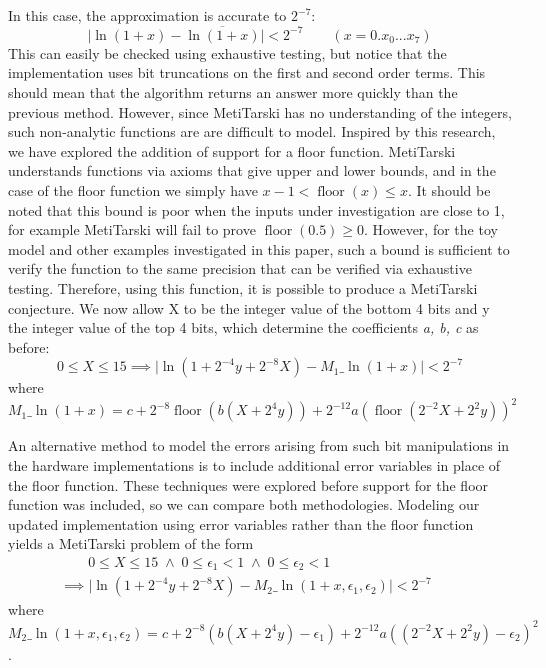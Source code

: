 \documentclass[smallcondensed]{svjour3}
\newcommand{\abs}[1]{\lvert#1\rvert}
\newcommand{\floor}{\mathop{\textrm{floor}}\nolimits}
\begin{document}
\noindent In this case, the approximation is accurate to $2^{-7}$: 
\[ 
\abs{\ln(1+x)-\overline{\ln(1+x)}} <2^{-7} \qquad (x= 0.x_0...x_7) \]
This can easily be checked using exhaustive testing, but notice that the implementation uses bit truncations on the first and second order terms. This should mean that the algorithm returns an answer more quickly than the previous method. However, since MetiTarski has no understanding of the integers, such non-analytic functions are are difficult to model. Inspired by this research, we have explored the addition of support for a floor function. MetiTarski understands functions via axioms that give upper and lower bounds, and in the case of the floor function we simply have $x-1< \floor(x)\le x$. It should be noted that this bound is poor when the inputs under investigation are close to 1, for example MetiTarski will fail to prove $\floor(0.5)\geq 0$.
However, for the toy model and other examples investigated in this paper, such a bound is sufficient to verify the function to the same precision that can be verified via exhaustive testing. Therefore, using this function, it is possible to produce a MetiTarski conjecture. We now allow X to be the integer value of the bottom 4 bits and y the integer value of the top 4 bits, which determine the coefficients \textit{a, b, c} as before:
\[
0\le X \le 15 \implies \abs{\ln(1+2^{-4}y+2^{-8}X) - M_1\_\ln(1+x)} <2^{-7}
\]
where $$M_1\_\ln(1+x)=c+2^{-8}\floor(b(X+2^{4}y))+2^{-12}a(\floor(2^{-2}X+2^{2}y))^2$$

An alternative method to model the errors arising from such bit manipulations in the hardware implementations is to include additional error variables in place of the floor function. These techniques were explored before support for the floor function was included, so we can compare both methodologies. Modeling our updated implementation using error variables rather than the floor function yields a MetiTarski problem of the form
\begin{multline*}
	\qquad 0\le X \le 15 \; \land \; 0\le \epsilon_1<1\; \land \; 0\le \epsilon_2<1 \\
	\implies \abs{\ln(1+2^{-4}y+2^{-8}X) - M_2\_\ln(1+x,\epsilon_1,\epsilon_2)} < 2^{-7}\qquad
\end{multline*}
where
$$M_2\_\ln(1+x,\epsilon_1,\epsilon_2)=c+2^{-8}(b(X+2^{4}y)-\epsilon_1)+2^{-12}a((2^{-2}X+2^{2}y)-\epsilon_2)^2$$.
\end{document}
